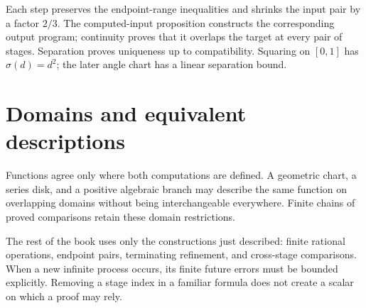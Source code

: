 Each step preserves the endpoint-range inequalities and shrinks the input
pair by a factor $2/3$.  The computed-input proposition constructs the
corresponding output program; continuity proves that it overlaps the
target at every pair of stages.  Separation proves uniqueness up to
compatibility.  Squaring on $[0,1]$ has $\sigma(d)=d^2$; the later
angle chart has a linear separation bound.

\section{Domains and equivalent descriptions}
Functions agree only where both computations are defined.  A geometric
chart, a series disk, and a positive algebraic branch may describe the same
function on overlapping domains without being interchangeable everywhere.
Finite chains of proved comparisons retain these domain restrictions.

The rest of the book uses only the constructions just described: finite
rational operations, endpoint pairs, terminating refinement, and
cross-stage comparisons.  When a new infinite process occurs, its finite
future errors must be bounded explicitly.  Removing a stage index in a
familiar formula does not create a scalar on which a proof may rely.
